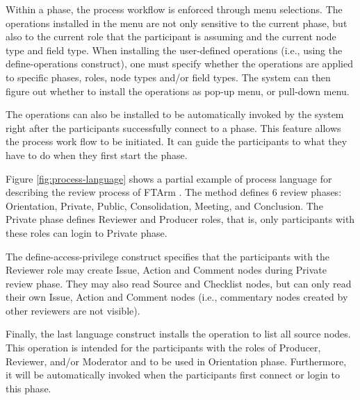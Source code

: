Within a phase, the process workflow is enforced through menu
selections. The operations installed in the menu are
not only sensitive to the current phase, but also to the current role that
the participant is assuming and the current node type and field type.
When installing the user-defined operations (i.e., using the
define-operations construct), one must specify
whether the operations are applied to specific 
phases, roles, node types and/or field types. The system can then
figure out whether to install the operations as pop-up menu,
or pull-down menu.

The operations can also be installed to be automatically invoked by the
system right after the participants successfully connect to a phase.
This feature allows the process work flow to be initiated. It can
guide the participants to what they have to do when they first
start the phase.

Figure \ref{fig:process-language} shows a partial  example of process
language for describing the review process of FTArm
\cite{Johnson93,CSDL-93-17}.  The method defines 6 review phases:
Orientation, Private, Public, Consolidation, Meeting, and Conclusion.
The Private phase defines Reviewer and Producer roles, that is, only
participants with these roles can login to Private phase.

The define-access-privilege construct specifies
that the participants with the Reviewer role 
may create Issue, Action and Comment nodes during 
Private review phase. They may also read Source
and Checklist nodes, but can only read their own Issue, Action and
Comment nodes (i.e., commentary nodes created by other reviewers are
not visible).

Finally, the last language construct installs the operation
to list all source nodes. This operation is intended for the
participants with the roles of Producer, Reviewer, and/or Moderator
and to be used in Orientation phase. Furthermore, it will be
automatically invoked when the participants first connect or login to
this phase.  


